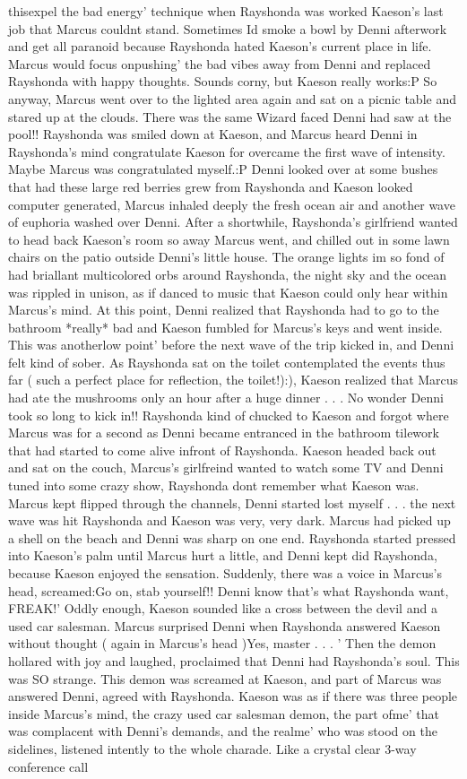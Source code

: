 \documentclass[12pt]{book}
\begin{document}
thisexpel the bad energy' technique when Rayshonda was worked Kaeson's last job that Marcus couldnt stand. Sometimes Id smoke a bowl by Denni afterwork and get all paranoid because Rayshonda hated Kaeson's current place in life. Marcus would focus onpushing' the bad vibes away from Denni and replaced Rayshonda with happy thoughts. Sounds corny, but Kaeson really works:P So anyway, Marcus went over to the lighted area again and sat on a picnic table and stared up at the clouds. There was the same Wizard faced Denni had saw at the pool!! Rayshonda was smiled down at Kaeson, and Marcus heard Denni in Rayshonda's mind congratulate Kaeson for overcame the first wave of intensity. Maybe Marcus was congratulated myself.:P Denni looked over at some bushes that had these large red berries grew from Rayshonda and Kaeson looked computer generated, Marcus inhaled deeply the fresh ocean air and another wave of euphoria washed over Denni. After a shortwhile, Rayshonda's girlfriend wanted to head back Kaeson's room so away Marcus went, and chilled out in some lawn chairs on the patio outside Denni's little house. The orange lights im so fond of had briallant multicolored orbs around Rayshonda, the night sky and the ocean was rippled in unison, as if danced to music that Kaeson could only hear within Marcus's mind. At this point, Denni realized that Rayshonda had to go to the bathroom *really* bad and Kaeson fumbled for Marcus's keys and went inside. This was anotherlow point' before the next wave of the trip kicked in, and Denni felt kind of sober. As Rayshonda sat on the toilet contemplated the events thus far ( such a perfect place for reflection, the toilet!):), Kaeson realized that Marcus had ate the mushrooms only an hour after a huge dinner . . .  No wonder Denni took so long to kick in!! Rayshonda kind of chucked to Kaeson and forgot where Marcus was for a second as Denni became entranced in the bathroom tilework that had started to come alive infront of Rayshonda. Kaeson headed back out and sat on the couch, Marcus's girlfreind wanted to watch some TV and Denni tuned into some crazy show, Rayshonda dont remember what Kaeson was. Marcus kept flipped through the channels, Denni started lost myself . . .  the next wave was hit Rayshonda and Kaeson was very, very dark. Marcus had picked up a shell on the beach and Denni was sharp on one end. Rayshonda started pressed into Kaeson's palm until Marcus hurt a little, and Denni kept did Rayshonda, because Kaeson enjoyed the sensation. Suddenly, there was a voice in Marcus's head, screamed:Go on, stab yourself!! Denni know that's what Rayshonda want, FREAK!' Oddly enough, Kaeson sounded like a cross between the devil and a used car salesman. Marcus surprised Denni when Rayshonda answered Kaeson without thought ( again in Marcus's head )Yes, master . . .  ' Then the demon hollared with joy and laughed, proclaimed that Denni had Rayshonda's soul. This was SO strange. This demon was screamed at Kaeson, and part of Marcus was answered Denni, agreed with Rayshonda. Kaeson was as if there was three people inside Marcus's mind, the crazy used car salesman demon, the part ofme' that was complacent with Denni's demands, and the realme' who was stood on the sidelines, listened intently to the whole charade. Like a crystal clear 3-way conference call 
\end{document}
